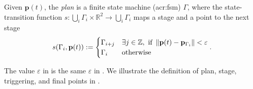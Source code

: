 \begin{highlight}  
  \begin{defn}[Plan]\label{def:plan}
    Given $\mathbf{p}(t)$, the \emph{plan} is a finite state machine (\Gls{acr:fsm}) $\Gamma$, where the state-transition function $s:\bigcup_i{\Gamma_i}\times\mathbb{R}^2\rightarrow\bigcup_i{\Gamma_i}$ maps a stage and a point to the next stage
    \begin{equation*}s(\Gamma_i,\mathbf{p}(t)):=\begin{cases}
      \Gamma_{i+j} & \exists j\in\mathbb{Z},\text{ if }\left\lVert\mathbf{p}(t)-\mathbf{p}_{\Gamma_i}\right\rVert<\varepsilon\\
      \Gamma_i & \text{otherwise}
    \end{cases}.\end{equation*}
  \end{defn}
\end{highlight}

The value $\varepsilon$ in  is the same $\varepsilon$ in . We illustrate the definition of plan, stage, triggering, and final points in .

